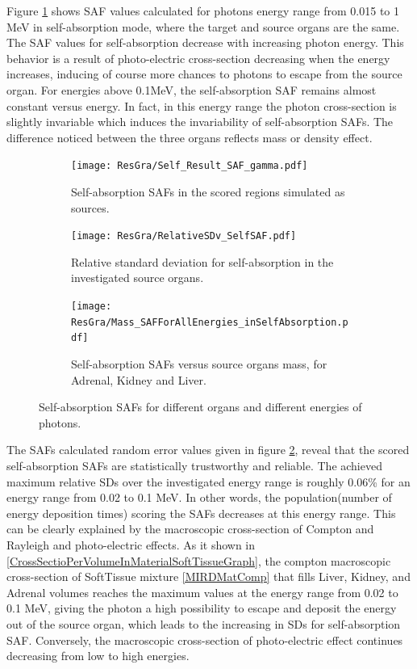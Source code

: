 \documentclass[letterpaper,12pt]{article}
\begin{document}
Figure \ref{fig:Resulted_Gamma_self_absorption} shows SAF values calculated for photons energy range from 0.015 to 1 MeV in self-absorption mode, where the target and source organs are the same. The SAF values for self-absorption decrease with increasing photon energy. This behavior is a result of photo-electric cross-section decreasing when the energy increases, inducing of course more chances to photons to escape from the source organ. For energies above 0.1MeV, the self-absorption SAF remains almost constant versus energy. In fact, in this energy range the photon cross-section is slightly invariable which induces the invariability of self-absorption SAFs. The difference noticed between the three organs reflects mass or density effect.

\begin{figure} [H]
\begin{subfigure}[t]{.5\textwidth}
  \centering
  \texttt{[image: ResGra/Self\_Result\_SAF\_gamma.pdf]}
	\caption{Self-absorption SAFs in the scored regions simulated as sources.}
	\label{fig:Resulted_Gamma_self_absorption}
\end{subfigure} \hspace{.01\textwidth}
\begin{subfigure}[t]{.5\textwidth}
  \centering
  \texttt{[image: ResGra/RelativeSDv\_SelfSAF.pdf]}
	\caption{Relative standard deviation for self-absorption in the investigated source organs.}
	\label{fig:Self_Rel_Sdev}
	\end{subfigure}\vspace{.06\textwidth}

\begin{subfigure}[t]{\textwidth}
  \centering
  \texttt{[image: ResGra/Mass\_SAFForAllEnergies\_inSelfAbsorption.pdf]}
	\caption{Self-absorption SAFs versus source organs mass, for Adrenal, Kidney and Liver.}
	\label{fig:SAF_versu_mass}
\end{subfigure}
	\caption{Self-absorption SAFs for different organs and different energies of photons. }
\end{figure}

The SAFs calculated random error values given in figure \ref{fig:Self_Rel_Sdev}, reveal that the scored self-absorption SAFs are statistically trustworthy and reliable. The achieved maximum relative SDs over the investigated energy range is roughly 0.06\% for an energy range from 0.02 to 0.1 MeV. In other words, the population(number of energy deposition times) scoring the SAFs decreases at this energy range. This can be clearly explained by the macroscopic cross-section of Compton and Rayleigh and photo-electric effects. As it shown in \ref{CrossSectioPerVolumeInMaterialSoftTissueGraph}, the compton macroscopic cross-section of SoftTissue mixture \ref{MIRDMatComp} that fills Liver, Kidney, and Adrenal volumes reaches the maximum values at the energy range from 0.02 to 0.1 MeV, giving the photon a high possibility to escape and deposit the energy out of the source organ, which leads to the increasing in SDs for self-absorption SAF. Conversely, the macroscopic cross-section of photo-electric effect continues decreasing from low to high energies.
\end{document}
